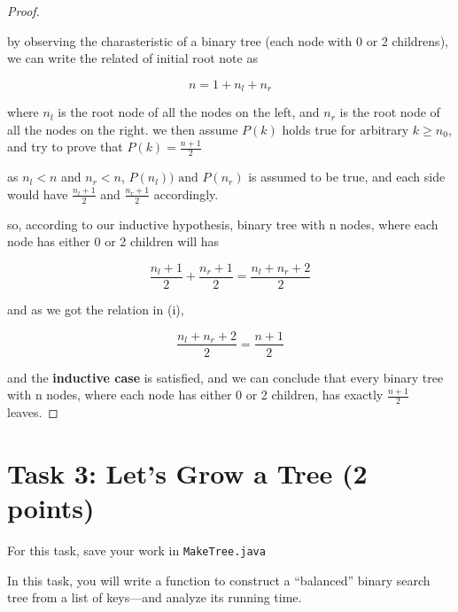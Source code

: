 \documentclass{article}
\theoremstyle{remark}
\begin{document}
\begin{proof}
\begin{center}
\end{center}

by observing the charasteristic of a binary tree (each node with 0 or 2 childrens), we can write the related of initial root note as 

\[n = 1 + n_l + n_r \tag{i}\]

where $n_l$ is the root node of all the nodes on the left, and $n_r$ is the root node of all the nodes on the right. we then assume $P(k)$ holds true for arbitrary $k \ge n_0$, and try to prove that $P(k) = \frac{n+1}{2}$

\vspace{1em}

as $n_l < n$ and $n_r < n$, $P(n_l)) \text{ and } P(n_r)$ is assumed to be true, and each side would have $\frac{n_l + 1}{2}$ and $\frac{n_r + 1}{2}$ accordingly. 

\vspace{1em}

so, according to our inductive hypothesis, binary tree with n nodes, where each node has either 0 or 2 children will has 

\[\frac{n_l + 1}{2} + \frac{n_r + 1}{2} = \frac{n_l + n_r + 2}{2}\]

and as we got the relation in (i), 

\[\frac{n_l + n_r + 2}{2} = \frac{n + 1}{2}\]

and the \textbf{inductive case} is satisfied, and we can conclude that every binary tree with n nodes, where each node has either 0 or 2 children, has exactly  $\frac{n+1}{2}$ leaves.

\end{proof}

\vspace{1em}
\hrulefill

\newpage
\section*{Task 3: Let’s Grow a Tree (2 points)}

For this task, save your work in \texttt{MakeTree.java}

In this task, you will write a function to construct a ``balanced'' binary search tree from a list of keys---and analyze its running time.
\end{document}
